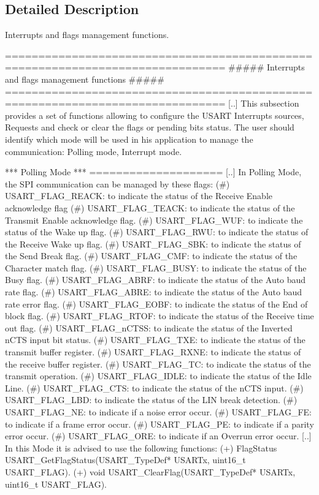 \subsection{Detailed Description}
Interrupts and flags management functions. \begin{DoxyVerb} ===============================================================================
            ##### Interrupts and flags management functions #####
 ===============================================================================
    [..] This subsection provides a set of functions allowing to configure the 
         USART Interrupts sources, Requests and check or clear the flags or pending bits status. 
         The user should identify which mode will be used in his application to 
         manage the communication: Polling mode, Interrupt mode.
         
 *** Polling Mode ***
 ====================
    [..] In Polling Mode, the SPI communication can be managed by these flags:
         (#) USART_FLAG_REACK: to indicate the status of the Receive Enable 
             acknowledge flag
         (#) USART_FLAG_TEACK: to indicate the status of the Transmit Enable 
             acknowledge flag.
         (#) USART_FLAG_WUF: to indicate the status of the Wake up flag.
         (#) USART_FLAG_RWU: to indicate the status of the Receive Wake up flag.
         (#) USART_FLAG_SBK: to indicate the status of the Send Break flag.
         (#) USART_FLAG_CMF: to indicate the status of the Character match flag.
         (#) USART_FLAG_BUSY: to indicate the status of the Busy flag.
         (#) USART_FLAG_ABRF: to indicate the status of the Auto baud rate flag.
         (#) USART_FLAG_ABRE: to indicate the status of the Auto baud rate error flag.
         (#) USART_FLAG_EOBF: to indicate the status of the End of block flag.
         (#) USART_FLAG_RTOF: to indicate the status of the Receive time out flag.
         (#) USART_FLAG_nCTSS: to indicate the status of the Inverted nCTS input 
             bit status.
         (#) USART_FLAG_TXE: to indicate the status of the transmit buffer register.
         (#) USART_FLAG_RXNE: to indicate the status of the receive buffer register.
         (#) USART_FLAG_TC: to indicate the status of the transmit operation.
         (#) USART_FLAG_IDLE: to indicate the status of the Idle Line.
         (#) USART_FLAG_CTS: to indicate the status of the nCTS input.
         (#) USART_FLAG_LBD: to indicate the status of the LIN break detection.
         (#) USART_FLAG_NE: to indicate if a noise error occur.
         (#) USART_FLAG_FE: to indicate if a frame error occur.
         (#) USART_FLAG_PE: to indicate if a parity error occur.
         (#) USART_FLAG_ORE: to indicate if an Overrun error occur.
    [..] In this Mode it is advised to use the following functions:
         (+) FlagStatus USART_GetFlagStatus(USART_TypeDef* USARTx, uint16_t USART_FLAG).
         (+) void USART_ClearFlag(USART_TypeDef* USARTx, uint16_t USART_FLAG).
               

\end{DoxyVerb}
